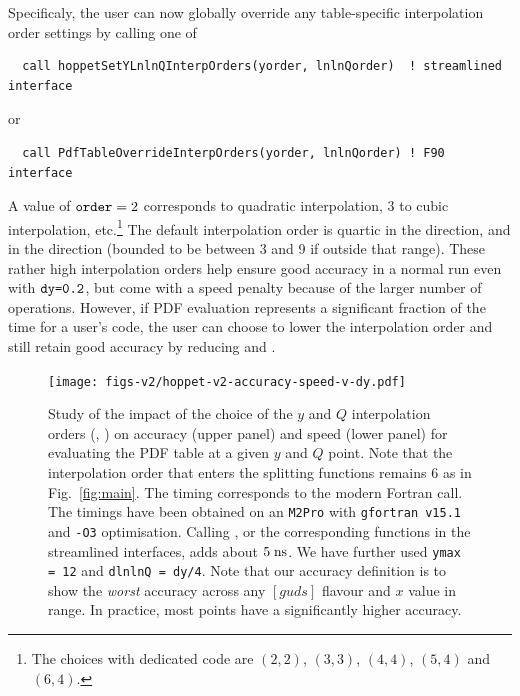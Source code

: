 


Specificaly, the user can now globally override any table-specific interpolation order
settings by calling one of
\begin{lstlisting}
  call hoppetSetYLnlnQInterpOrders(yorder, lnlnQorder)  ! streamlined interface
\end{lstlisting}
or
\begin{lstlisting}
  call PdfTableOverrideInterpOrders(yorder, lnlnQorder) ! F90 interface
\end{lstlisting}
A value of $\texttt{order}=2$ corresponds to quadratic interpolation, $3$ to
cubic interpolation, etc.\footnote{The 
  choices with dedicated code are $(2,2)$, $(3,3)$, $(4,4)$, $(5,4)$
  and $(6,4)$.}
%
The default interpolation order is quartic in the 
direction, and  in the  direction (bounded
to be between 3 and 9 if outside that range).
%
These rather high interpolation orders help ensure good accuracy in a normal
\hoppet{} run even with $\texttt{dy=0.2}$, but come with a speed penalty
because of the larger number of operations.
%
However, if PDF evaluation represents a significant fraction of the
time for a user's code, the user can choose to lower the interpolation
order and still retain good accuracy by reducing  and
.

\begin{figure}[tbp]
    \centering
        \texttt{[image: figs-v2/hoppet-v2-accuracy-speed-v-dy.pdf]}
    \caption{
      Study of the impact of the choice of the $y$ and $Q$ interpolation
      orders (, ) on accuracy (upper panel) and speed
      (lower panel) for evaluating
      the PDF table at a given $y$ and $Q$ point.
      Note that the interpolation order that enters the splitting
      functions remains $6$ as in Fig.~\ref{fig:main}.
      The timing corresponds to the  modern
      Fortran call.
      The timings have been
      obtained on an \texttt{M2Pro} with \texttt{gfortran v15.1} and
      \texttt{-O3} optimisation.
      Calling , or the corresponding
      functions in the streamlined interfaces, adds about $5\;\mathrm{ns}$.
      We have further used \texttt{ymax = 12} and
      \texttt{dlnlnQ = dy/4}.
      Note that our accuracy definition is to show the \emph{worst}
      accuracy across any $[guds]$ flavour and $x$ value in range.
      In practice, most points have a significantly higher accuracy.
    }
        \label{fig:interp-accuracy}
\end{figure}


